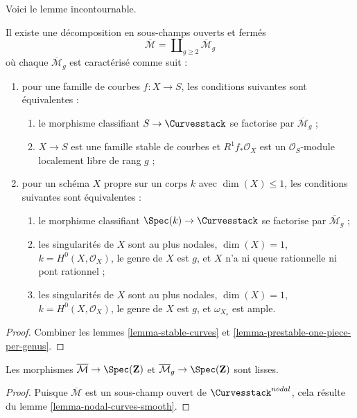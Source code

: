 \noindent
Voici le lemme incontournable.

\begin{lemma}
\label{lemma-stable-one-piece-per-genus}
Il existe une décomposition en sous-champs ouverts et fermés
$$
\overline{\mathcal{M}} = \coprod\nolimits_{g \geq 2} \overline{\mathcal{M}}_g
$$
où chaque $\overline{\mathcal{M}}_g$ est caractérisé comme suit :
\begin{enumerate}
\item pour une famille de courbes $f : X \to S$, les conditions suivantes sont équivalentes :
\begin{enumerate}
\item le morphisme classifiant $S \to \Curvesstack$ se factorise
par $\overline{\mathcal{M}}_g$ ;
\item $X \to S$ est une famille stable de courbes et
$R^1f_*\mathcal{O}_X$ est un $\mathcal{O}_S$-module localement libre de rang $g$ ;
\end{enumerate}
\item pour un schéma $X$ propre sur un corps $k$ avec
$\dim(X) \leq 1$, les conditions suivantes sont équivalentes :
\begin{enumerate}
\item le morphisme classifiant $\Spec(k) \to \Curvesstack$
se factorise par $\overline{\mathcal{M}}_g$ ;
\item les singularités de $X$ sont au plus nodales, $\dim(X) = 1$,
$k = H^0(X, \mathcal{O}_X)$, le genre de $X$ est $g$, et $X$
n'a ni queue rationnelle ni pont rationnel ;
\item les singularités de $X$ sont au plus nodales, $\dim(X) = 1$,
$k = H^0(X, \mathcal{O}_X)$, le genre de $X$ est $g$, et
$\omega_{X_s}$ est ample.
\end{enumerate}
\end{enumerate}
\end{lemma}

\begin{proof}
Combiner les lemmes \ref{lemma-stable-curves} et
\ref{lemma-prestable-one-piece-per-genus}.
\end{proof}

\begin{lemma}
\label{lemma-stable-curves-smooth}
Les morphismes
$\overline{\mathcal{M}} \to \Spec(\mathbf{Z})$ et
$\overline{\mathcal{M}}_g \to \Spec(\mathbf{Z})$
sont lisses.
\end{lemma}

\begin{proof}
Puisque $\overline{\mathcal{M}}$ est un sous-champ ouvert de
$\Curvesstack^{nodal}$, cela résulte du
lemme \ref{lemma-nodal-curves-smooth}.
\end{proof}

